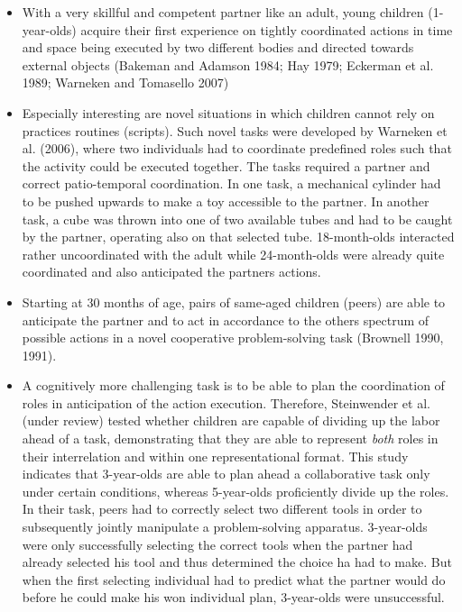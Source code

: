 \documentclass{article}
\begin{document}
\begin{itemize}

\item With a very skillful and competent partner like an adult, young children
(1-year-olds) acquire their first experience on tightly coordinated actions in
time and space being executed by two different bodies and directed towards
external objects (Bakeman and Adamson 1984; Hay 1979; Eckerman et al. 1989;
Warneken and Tomasello 2007)

\item Especially interesting are novel situations in which children cannot rely
on practices routines (scripts). Such novel tasks were developed by Warneken et
al. (2006), where two individuals had to coordinate predefined roles such that
the activity could be executed together. The tasks required a partner and
correct patio-temporal coordination. In one task, a mechanical cylinder had to
be pushed upwards to make a toy accessible to the partner. In another task, a
cube was thrown into one of two available tubes and had to be caught by the
partner, operating also on that selected tube. 18-month-olds interacted rather
uncoordinated with the adult while 24-month-olds were already quite coordinated
and also anticipated the partners actions.

\item Starting at 30 months of age, pairs of same-aged children (peers) are
able to anticipate the partner and to act in accordance to the others spectrum
of possible actions in a novel cooperative problem-solving task (Brownell 1990,
1991). 

\item A cognitively more challenging task is to be able to plan the
coordination of roles in anticipation of the action execution. Therefore,
Steinwender et al. (under review) tested whether children are capable of
dividing up the labor ahead of a task, demonstrating that they are able to
represent \textit{both} roles in their interrelation and within one
representational format. This study indicates that 3-year-olds are able to plan
ahead a collaborative task only under certain conditions, whereas 5-year-olds
proficiently divide up the roles. In their task, peers had to correctly select
two different tools in order to subsequently jointly manipulate a
problem-solving apparatus. 3-year-olds were only successfully selecting the
correct tools when the partner had already selected his tool and thus
determined the choice ha had to make. But when the first selecting individual
had to predict what the partner would do before he could make his won
individual plan, 3-year-olds were unsuccessful.

\end{itemize}
\end{document}
